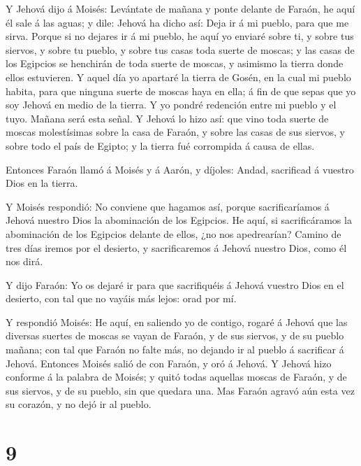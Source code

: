  Y Jehová dijo á Moisés: Levántate de mañana y ponte
delante de Faraón, he aquí él sale á las aguas; y dile: Jehová ha dicho
así: Deja ir á mi pueblo, para que me sirva.  Porque si no
dejares ir á mi pueblo, he aquí yo enviaré sobre ti, y sobre tus
siervos, y sobre tu pueblo, y sobre tus casas toda suerte de moscas; y
las casas de los Egipcios se henchirán de toda suerte de moscas, y
asimismo la tierra donde ellos estuvieren.  Y aquel día yo
apartaré la tierra de Gosén, en la cual mi pueblo habita, para que
ninguna suerte de moscas haya en ella; á fin de que sepas que yo soy
Jehová en medio de la tierra.  Y yo pondré redención entre
mi pueblo y el tuyo. Mañana será esta señal.  Y Jehová lo
hizo así: que vino toda suerte de moscas molestísimas sobre la casa de
Faraón, y sobre las casas de sus siervos, y sobre todo el país de
Egipto; y la tierra fué corrompida á causa de ellas.

 Entonces Faraón llamó á Moisés y á Aarón, y díjoles:
Andad, sacrificad á vuestro Dios en la tierra.

 Y Moisés respondió: No conviene que hagamos así, porque
sacrificaríamos á Jehová nuestro Dios la abominación de los Egipcios. He
aquí, si sacrificáramos la abominación de los Egipcios delante de ellos,
¿no nos apedrearían?  Camino de tres días iremos por el
desierto, y sacrificaremos á Jehová nuestro Dios, como él nos dirá.

 Y dijo Faraón: Yo os dejaré ir para que sacrifiquéis á
Jehová vuestro Dios en el desierto, con tal que no vayáis más lejos:
orad por mí.

 Y respondió Moisés: He aquí, en saliendo yo de contigo,
rogaré á Jehová que las diversas suertes de moscas se vayan de Faraón, y
de sus siervos, y de su pueblo mañana; con tal que Faraón no falte más,
no dejando ir al pueblo á sacrificar á Jehová.  Entonces
Moisés salió de con Faraón, y oró á Jehová.  Y Jehová hizo
conforme á la palabra de Moisés; y quitó todas aquellas moscas de
Faraón, y de sus siervos, y de su pueblo, sin que quedara una.
 Mas Faraón agravó aún esta vez su corazón, y no dejó ir al
pueblo.

\hypertarget{section-8}{%
\section{9}\label{section-8}}

